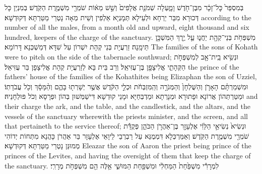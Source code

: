 {בְּמִסְפַּר֙ כׇּל־זָכָ֔ר מִבֶּן־חֹ֖דֶשׁ וָמָ֑עְלָה שְׁמֹנַ֤ת אֲלָפִים֙ וְשֵׁ֣שׁ מֵא֔וֹת שֹׁמְרֵ֖י מִשְׁמֶ֥רֶת הַקֹּֽדֶשׁ׃}
{בְּמִנְיַן כָּל דְּכוּרָא מִבַּר יַרְחָא וּלְעֵילָא תְּמָנְיָא אַלְפִין וְשֵׁית מְאָה נָטְרֵי מַטַּרְתָּא דְּקוּדְשָׁא׃}
{according to the number of all the males, from a month old and upward, eight thousand and six hundred, keepers of the charge of the sanctuary.}{}
{מִשְׁפְּחֹ֥ת בְּנֵי־קְהָ֖ת יַחֲנ֑וּ עַ֛ל יֶ֥רֶךְ הַמִּשְׁכָּ֖ן תֵּימָֽנָה׃
}
{זַרְעֲיָת בְּנֵי קְהָת יִשְׁרוֹן עַל שִׁדָּא דְּמַשְׁכְּנָא דָּרוֹמָא׃}
{The families of the sons of Kohath were to pitch on the side of the tabernacle southward;}{}
{וּנְשִׂ֥יא בֵֽית־אָ֖ב לְמִשְׁפְּחֹ֣ת הַקְּהָתִ֑י אֱלִיצָפָ֖ן בֶּן־עֻזִּיאֵֽל׃}
{וְרַב בֵּית בָּא לְזַרְעֲיָת קְהָת אֱלִיצָפָן בַּר עֻזִּיאֵל׃}
{the prince of the fathers’ house of the families of the Kohathites being Elizaphan the son of Uzziel,}{}
{וּמִשְׁמַרְתָּ֗ם הָאָרֹ֤ן וְהַשֻּׁלְחָן֙ וְהַמְּנֹרָ֣ה וְהַֽמִּזְבְּחֹ֔ת וּכְלֵ֣י הַקֹּ֔דֶשׁ אֲשֶׁ֥ר יְשָׁרְת֖וּ בָּהֶ֑ם וְהַ֨מָּסָ֔ךְ וְכֹ֖ל עֲבֹדָתֽוֹ׃
}
{וּמַטַּרְתְּהוֹן אֲרוֹנָא וּפָתוּרָא וּמְנָרְתָא וּמַדְבְּחַיָּא וּמָנֵי קוּדְשָׁא דִּישַׁמְּשׁוּן בְּהוֹן וּפְרָסָא וְכֹל פּוּלְחָנֵיהּ׃}
{and their charge the ark, and the table, and the candlestick, and the altars, and the vessels of the sanctuary wherewith the priests minister, and the screen, and all that pertaineth to the service thereof;}{}
{וּנְשִׂיא֙ נְשִׂיאֵ֣י הַלֵּוִ֔י אֶלְעָזָ֖ר בֶּן־אַהֲרֹ֣ן הַכֹּהֵ֑ן פְּקֻדַּ֕ת שֹׁמְרֵ֖י מִשְׁמֶ֥רֶת הַקֹּֽדֶשׁ׃
}
{וְאַמַּרְכְּלָא דִּמְמֻנַּא עַל רַבְרְבֵי לֵיוָאֵי אֶלְעָזָר בַּר אַהֲרֹן כָּהֲנָא מִתְּחוֹת יְדוֹהִי מְמוּנַּן נָטְרֵי מַטַּרְתָּא דְּקוּדְשָׁא׃}
{Eleazar the son of Aaron the priest being prince of the princes of the Levites, and having the oversight of them that keep the charge of the sanctuary.}{}
{לִמְרָרִ֕י מִשְׁפַּ֙חַת֙ הַמַּחְלִ֔י וּמִשְׁפַּ֖חַת הַמּוּשִׁ֑י אֵ֥לֶּה הֵ֖ם מִשְׁפְּחֹ֥ת מְרָרִֽי׃}
